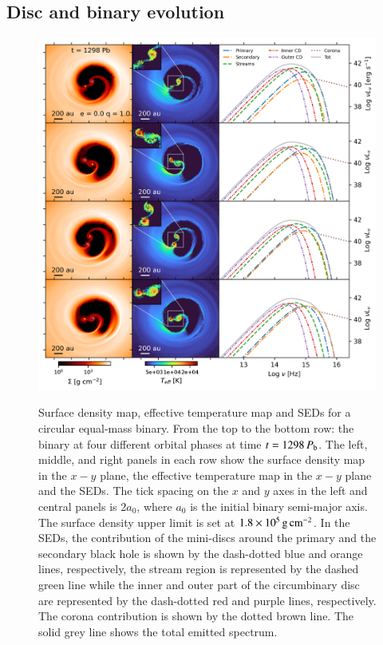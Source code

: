 \documentclass{aa}
\begin{document}
\subsection{Disc and binary evolution}
\label{Results_HR_ae}

\begin{figure}
    \includegraphics[width=\textwidth]{Figures/e0q1_hr01_md001_12989_PgasPrad.pdf} \\
    \caption{Surface density map, effective temperature map and SEDs for a circular equal-mass binary. From the top to the bottom row: the binary at four different orbital phases at time $t = 1298 \, P_{\rm b}$. The left, middle, and right panels in each row show the surface density map in the $x-y$ plane, the effective temperature map in the $x-y$ plane and the SEDs. The tick spacing on the $x$ and $y$ axes in the left and central panels is 2$a_0$, where $a_0$ is the initial binary semi-major axis.
    The surface density upper limit is set at $1.8 \times 10^5 \, \rm{g \, cm^{-2}}$. 
    In the SEDs, the contribution of the mini-discs around the primary and the secondary black hole is shown by the dash-dotted blue and orange lines, respectively, the stream region is represented by the dashed green line while the inner and outer part of the circumbinary disc are represented by the dash-dotted red and purple lines, respectively. The corona contribution is shown by the dotted brown line. The solid grey line shows the total emitted spectrum. }
    \label{fig:SEDe0q1}
\end{figure}
\end{document}
